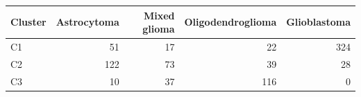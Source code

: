 \begin{tabular}{lrrrr}
\toprule
\textbf{Cluster} & \textbf{Astrocytoma} & \textbf{Mixed glioma} & \textbf{Oligodendroglioma} & \textbf{Glioblastoma} \\
\midrule
C1 & 51 & 17 & 22 & 324 \\
C2 & 122 & 73 & 39 & 28 \\
C3 & 10 & 37 & 116 & 0 \\
\bottomrule
\end{tabular}
